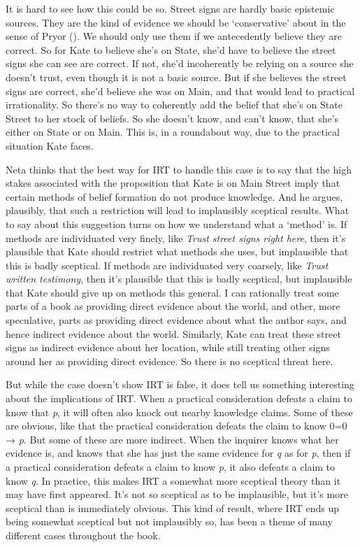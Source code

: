 \documentclass[
  12pt,
  letterpaper,
]{scrbook}
\begin{document}
It is hard to see how this could be so. Street signs are hardly basic
epistemic sources. They are the kind of evidence we should be
`conservative' about in the sense of Pryor
(). We should only use them if we
antecedently believe they are correct. So for Kate to believe she's on
State, she'd have to believe the street signs she can see are correct.
If not, she'd incoherently be relying on a source she doesn't trust,
even though it is not a basic source. But if she believes the street
signs are correct, she'd believe she was on Main, and that would lead to
practical irrationality. So there's no way to coherently add the belief
that she's on State Street to her stock of beliefs. So she doesn't know,
and can't know, that she's either on State or on Main. This is, in a
roundabout way, due to the practical situation Kate faces.

Neta thinks that the best way for IRT to handle this case is to say that
the high stakes associated with the proposition that Kate is on Main
Street imply that certain methods of belief formation do not produce
knowledge. And he argues, plausibly, that such a restriction will lead
to implausibly sceptical results. What to say about this suggestion
turns on how we understand what a `method' is. If methods are
individuated very finely, like \emph{Trust street signs right here},
then it's plausible that Kate should restrict what methods she uses, but
implausible that this is badly sceptical. If methods are individuated
very coarsely, like \emph{Trust written testimony}, then it's plausible
that this is badly sceptical, but implausible that Kate should give up
on methods this general. I can rationally treat some parts of a book as
providing direct evidence about the world, and other, more speculative,
parts as providing direct evidence about what the author says, and hence
indirect evidence about the world. Similarly, Kate can treat these
street signs as indirect evidence about her location, while still
treating other signs around her as providing direct evidence. So there
is no sceptical threat here.

But while the case doesn't show IRT is false, it does tell us something
interesting about the implications of IRT. When a practical
consideration defeats a claim to know that \emph{p}, it will often also
knock out nearby knowledge claims. Some of these are obvious, like that
the practical consideration defeats the claim to know 0=0 → \emph{p}.
But some of these are more indirect. When the inquirer knows what her
evidence is, and knows that she has just the same evidence for \emph{q}
as for \emph{p}, then if a practical consideration defeats a claim to
know \emph{p}, it also defeats a claim to know \emph{q}. In practice,
this makes IRT a somewhat more sceptical theory than it may have first
appeared. It's not so sceptical as to be implausible, but it's more
sceptical than is immediately obvious. This kind of result, where IRT
ends up being somewhat sceptical but not implausibly so, has been a
theme of many different cases throughout the book.
\end{document}
